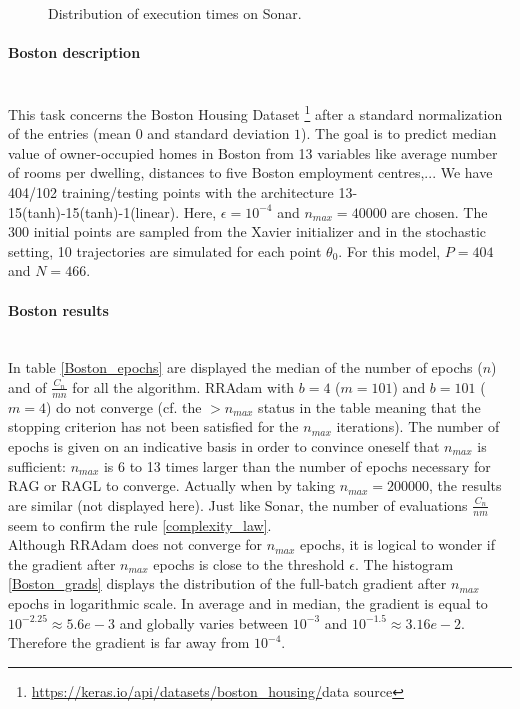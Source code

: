 \begin{figure}[h!]
	\centering
	\scalebox{0.7}{}
	\caption{Distribution of execution times on Sonar.}
	\label{Sonar_time}
\end{figure} 

\paragraph{Boston description}
~~\\
This task concerns the Boston Housing Dataset \footnote{\url{https://keras.io/api/datasets/boston_housing/}{data source}} after a standard normalization of the entries (mean $0$
and standard deviation $1$). The goal is to predict median value of owner-occupied homes in Boston from 13 variables like average number of rooms per dwelling, distances to five
Boston employment centres,... We have 404/102 training/testing points with the architecture 13-15(tanh)-15(tanh)-1(linear). Here, $\epsilon=10^{-4}$ and $n_{max}=40000$ are chosen. The $300$ initial points are sampled from the Xavier initializer and in the stochastic setting, 10 trajectories are simulated for each point $\theta_0$. For this model, $P=404$ and $N=466$.

\paragraph{Boston results}
~~\\
In table \ref{Boston_epochs} are displayed the median of the number of epochs ($n$) and of $\frac{C_n}{mn}$ for all the algorithm. RRAdam with $b=4$ ($m=101$) and $b=101$ ($m=4$)
do not converge (cf. the $> n_{max}$ status in the table meaning that the stopping criterion has not been satisfied for the $n_{max}$ iterations). The number of epochs is given on
an indicative basis in order to convince oneself that $n_{max}$ is sufficient: $n_{max}$ is 6 to 13 times larger than the number of epochs necessary for RAG or RAGL to converge.
Actually when by taking $n_{max}=200000$, the results are similar (not displayed here).
Just like Sonar, the number of evaluations $\frac{C_n}{nm}$ seem to confirm the rule \eqref{complexity_law}. \\
Although RRAdam does not converge for $n_{max}$ epochs, it is logical to wonder if the gradient after $n_{max}$ epochs is close to the threshold $\epsilon$. The histogram
\ref{Boston_grads} displays the distribution of the full-batch gradient after $n_{max}$ epochs in logarithmic scale. In average and in median, the gradient is equal to $10^{-2.25}\approx 5.6e-3$ and globally varies between $10^{-3}$ and $10^{-1.5}\approx3.16e-2$. Therefore the gradient is far away from $10^{-4}$. 

